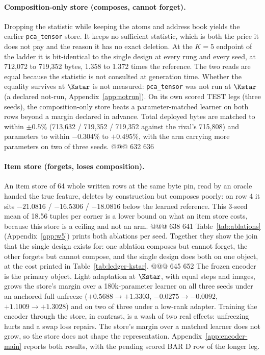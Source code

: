 \paragraph{Composition-only store (composes, cannot forget).} Dropping the statistic while
keeping the atoms and address book yields the earlier \texttt{pca\_tensor} store. It keeps no
sufficient statistic, which is both the price it does not pay and the reason it has no exact
deletion. At the $K=5$ endpoint of the ladder it is bit-identical to the single design at every
rung and every seed, at 712,072 to 719,352 bytes, 1.358 to 1.372 times the reference.
The two reads are equal because the statistic is not consulted at generation time. Whether the
equality survives at $\Kstar$ is not measured: \texttt{pca\_tensor} was not run at
$\Kstar$ (a declared not-run, Appendix~\ref{app:notrun}). 
On its own scored TEST legs (three seeds), the composition-only store beats a parameter-matched
learner on both rows beyond a margin declared in advance. Total deployed bytes are matched to
within $\pm0.5$\% (713,632 / 719,352 / 719,352 against the rival's 715,808) and parameters to
within $-0.304$\% to $+0.495$\%, with the arm carrying more parameters on two of three seeds.
@@@ 632 636
\paragraph{Item store (forgets, loses composition).} An item store of 64 whole written rows at
the same byte pin, read by an oracle handed the true feature, deletes by construction but
composes poorly: on row 4 it sits $-21.0816$ / $-16.5306$ / $-18.0816$ below the learned
reference. This 3-seed mean of 18.56 tuples per corner is a lower bound on what an item store
costs, because this store is a ceiling and not an arm. %
@@@ 638 641
Table~\ref{tab:ablations} (Appendix~\ref{app:w5}) prints both ablations per seed. Together they
show the join that the single design exists for: one ablation composes but cannot forget, the
other forgets but cannot compose, and the single design does both on one object, at the cost
printed in Table~\ref{tab:ledger-kstar}.
@@@ 645 652
The frozen encoder is the primary object. Light adaptation at $\Kstar$, with equal steps and
images, grows the store's margin over a 180k-parameter learner on all three seeds under an
anchored full unfreeze ($+0.5688\to+1.3303$, $-0.0275\to-0.0092$, $+1.1009\to+1.3028$) and on two
of three under a low-rank adapter. %
Training the encoder through the store, in contrast, is a wash of two real effects: unfreezing
hurts and a swap loss repairs. The store's margin over a matched learner does not grow, so the
store does not shape the representation. Appendix~\ref{app:encoder-main} reports both results,
with the pending scored BAR D row of the longer leg.
